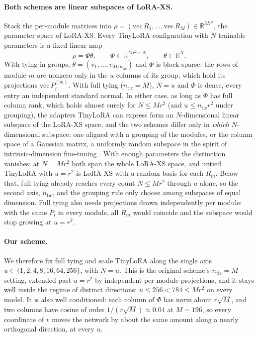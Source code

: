 \documentclass[twoside]{article}
\newcommand{\mbR}{\mathbb{R}}
\begin{document}
\paragraph{Both schemes are linear subspaces of LoRA-XS.}
Stack the per-module matrices into $\rho = (\mathrm{vec}\, R_1, \dots, \mathrm{vec}\, R_M) \in \mbR^{M r^2}$, the parameter space of LoRA-XS. Every TinyLoRA configuration with $N$ trainable parameters is a fixed linear map
\begin{equation}
    \rho = \Phi \theta, \qquad \Phi \in \mbR^{M r^2 \times N}, \qquad \theta \in \mbR^N.
\end{equation}
With tying in groups, $\theta = (v_1, \dots, v_{M/n_\mathrm{tie}})$ and $\Phi$ is block-sparse: the rows of module $m$ are nonzero only in the $u$ columns of its group, which hold its projections $\mathrm{vec}\, P^{(m)}_i$. With full tying ($n_\mathrm{tie} = M$), $N = u$ and $\Phi$ is dense, every entry an independent standard normal. In either case, as long as $\Phi$ has full column rank, which holds almost surely for $N \le M r^2$ (and $u \le n_\mathrm{tie} r^2$ under grouping), the adapters TinyLoRA can express form an $N$-dimensional linear subspace of the LoRA-XS space, and the two schemes differ only in \emph{which} $N$-dimensional subspace: one aligned with a grouping of the modules, or the column space of a Gaussian matrix, a uniformly random subspace in the spirit of intrinsic-dimension fine-tuning \citep{aghajanyan2021intrinsic}. With enough parameters the distinction vanishes: at $N = M r^2$ both span the whole LoRA-XS space, and untied TinyLoRA with $u = r^2$ is LoRA-XS with a random basis for each $R_m$. Below that, full tying already reaches every count $N \le M r^2$ through $u$ alone, so the second axis, $n_\mathrm{tie}$, and the grouping rule only choose among subspaces of equal dimension. Full tying also needs projections drawn independently per module: with the same $P_i$ in every module, all $R_m$ would coincide and the subspace would stop growing at $u = r^2$.

\paragraph{Our scheme.}
We therefore fix full tying and scale TinyLoRA along the single axis $u \in \{1, 2, 4, 8, 16, 64, 256\}$, with $N = u$. This is the original scheme's $n_\mathrm{tie} = M$ setting, extended past $u = r^2$ by independent per-module projections, and it stays well inside the regime of distinct directions: $u \le 256 < 784 \le M r^2$ on every model. It is also well conditioned: each column of $\Phi$ has norm about $r\sqrt{M}$, and two columns have cosine of order $1/(r\sqrt{M}) \approx 0.04$ at $M = 196$, so every coordinate of $v$ moves the network by about the same amount along a nearly orthogonal direction, at every $u$.
\end{document}
